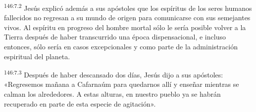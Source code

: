 \par 
\textsuperscript{146:7.2} Jesús explicó además a sus apóstoles que los espíritus de los seres humanos fallecidos no regresan a su mundo de origen para comunicarse con sus semejantes vivos. Al espíritu en progreso del hombre mortal sólo le sería posible volver a la Tierra después de haber transcurrido una época dispensacional, e incluso entonces, sólo sería en casos excepcionales y como parte de la administración espiritual del planeta.

\par 
\textsuperscript{146:7.3} Después de haber descansado dos días, Jesús dijo a sus apóstoles: «Regresemos mañana a Cafarnaúm para quedarnos allí y enseñar mientras se calman los alrededores. A estas alturas, en nuestro pueblo ya se habrán recuperado en parte de esta especie de agitación».